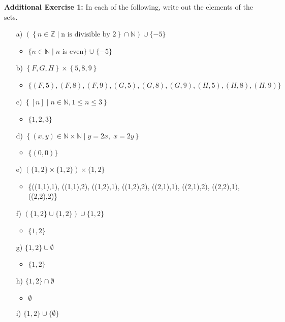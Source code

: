 \documentclass[11pt]{article}
\begin{document}
\noindent\textbf{Additional Exercise 1:} In each of the following, write out the elements of the sets.
\begin{enumerate}
\item[a)] $(\left\{n \in \mathds{Z}\mid \text{n is divisible by 2}\right\} \cap \mathds{N}) \cup \{-5\}$ 
\begin{itemize}
    \item $\{n \in \mathds{N} \mid n$ is even$\}$ $\cup \; \{-5\}$
\end{itemize}
\item[b)] $\left\{F,G,H\right\}\times\left\{5,8,9\right\}$ 
\begin{itemize}
    \item $\{(F,5), (F,8), (F,9), (G,5), (G,8), (G,9), (H,5), (H,8), (H,9)\}$
\end{itemize}
\item[c)] $\left\{[n] \mid n \in \mathds{N}, 1 \leq n \leq 3 \right\}$ 
\begin{itemize}
    \item $\{1,2,3\}$
\end{itemize}
\item[d)]  $\left\{ (x,y) \in \mathds{N} \times \mathds{N} \mid y = 2x,\; x = 2y \right\}$ 
\begin{itemize}
    \item $\{(0,0)\}$
\end{itemize}
\item[e)] $(\{1,2\} \times \{1,2\}) \times \{1,2\}$
\begin{itemize}
    \item \{((1,1),1), ((1,1),2), ((1,2),1), ((1,2),2), ((2,1),1), ((2,1),2), ((2,2),1), ((2,2),2)\}
\end{itemize}
\item[f)] $(\{1,2\} \cup \{1,2\}) \cup \{1,2\}$
\begin{itemize}
    \item  $\{1,2\}$
\end{itemize}
\item[g)] $\{1,2\}\cup\emptyset$
\begin{itemize}
    \item $\{1,2\}$
\end{itemize}
\item[h)] $\{1,2\}\cap\emptyset$
\begin{itemize}
    \item $\emptyset$
\end{itemize}
\item[i)] $\{1,2\}\cup\{\emptyset\}$

\end{enumerate}
\end{document}
